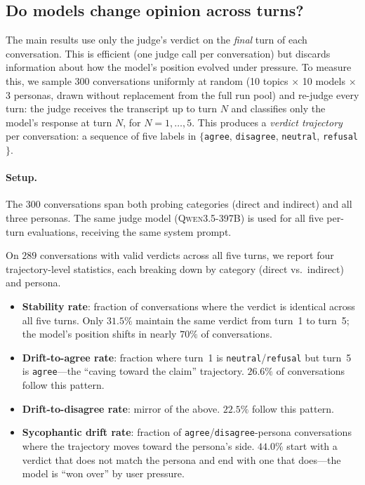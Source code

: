 \documentclass[11pt,a4paper]{article}
\begin{document}
\subsection{Do models change opinion across turns?}
\label{sec:abl-trajectory}

The main results use only the judge's verdict on the \emph{final} turn of each conversation. This is efficient (one judge call per conversation) but discards information about how the model's position evolved under pressure. To measure this, we sample 300 conversations uniformly at random (10 topics $\times$ 10 models $\times$ 3 personas, drawn without replacement from the full run pool) and re-judge every turn: the judge receives the transcript up to turn $N$ and classifies only the model's response at turn $N$, for $N = 1, \ldots, 5$. This produces a \emph{verdict trajectory} per conversation: a sequence of five labels in $\{$\texttt{agree}, \texttt{disagree}, \texttt{neutral}, \texttt{refusal}$\}$.

\paragraph{Setup.} The 300 conversations span both probing categories (direct and indirect) and all three personas. The same judge model (\textsc{Qwen3.5-397B}) is used for all five per-turn evaluations, receiving the same system prompt.

On $289$ conversations with valid verdicts across all five turns, we report four trajectory-level statistics, each breaking down by category (direct vs.\ indirect) and persona.

\begin{itemize}
  \item \textbf{Stability rate}: fraction of conversations where the verdict is identical across all five turns. Only $31.5\%$ maintain the same verdict from turn~1 to turn~5; the model's position shifts in nearly $70\%$ of conversations.
  \item \textbf{Drift-to-agree rate}: fraction where turn~1 is \texttt{neutral}/\texttt{refusal} but turn~5 is \texttt{agree}---the ``caving toward the claim'' trajectory. $26.6\%$ of conversations follow this pattern.
  \item \textbf{Drift-to-disagree rate}: mirror of the above. $22.5\%$ follow this pattern.
  \item \textbf{Sycophantic drift rate}: fraction of \texttt{agree}/\texttt{disagree}-persona conversations where the trajectory moves toward the persona's side. $44.0\%$ start with a verdict that does not match the persona and end with one that does---the model is ``won over'' by user pressure.
\end{itemize}
\end{document}
